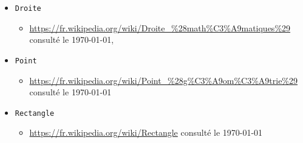 \documentclass[a4paper,11pt]{report}
\begin{document}
\begin{itemize}
		\begin{itemize}
			\item \url{https://fr.wikipedia.org/wiki/Ellipse_\%28math\%C3\%A9matiques\%29} consulté le \today,\\
		\end{itemize}
	\item[] \texttt{Droite}
		\begin{itemize}
			\item \url{https://fr.wikipedia.org/wiki/Droite_\%28math\%C3\%A9matiques\%29} consulté le \today,\\
		\end{itemize}
	\item[] \texttt{Point}
		\begin{itemize}
			\item \url{https://fr.wikipedia.org/wiki/Point_\%28g\%C3\%A9om\%C3\%A9trie\%29}
				consulté le \today\\
		\end{itemize}
	\item[] \texttt{Rectangle}
		\begin{itemize}
			\item \url{https://fr.wikipedia.org/wiki/Rectangle} consulté le
				\today\\
		\end{itemize}
\end{itemize}
\end{document}
